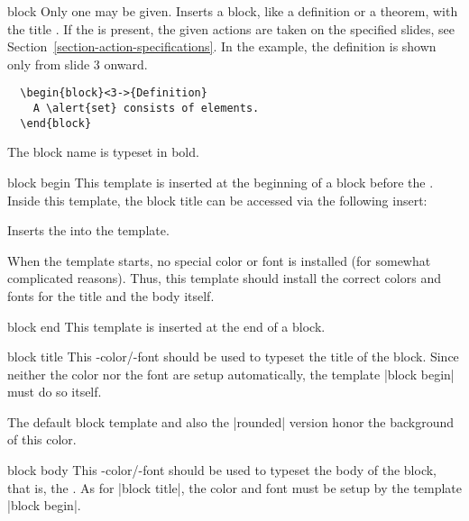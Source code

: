 \begin{environment}{{block}}
  Only one  may be given. Inserts a block, like a definition or a theorem, with the title . If the  is present, the given actions are taken on the specified slides, see Section~\ref{section-action-specifications}. In the example, the definition is shown only from slide 3 onward.
  \example
\begin{verbatim}
  \begin{block}<3->{Definition}
    A \alert{set} consists of elements.
  \end{block}
\end{verbatim}

  \articlenote
  The block name is typeset in bold.

  \begin{element}{block begin}\yes\no\no
    This template is inserted at the beginning of a block before the . Inside this template, the block title can be accessed via the following insert:
    \begin{itemize}
      \iteminsert{\insertblocktitle}
      Inserts the  into the template.
    \end{itemize}

    When the template starts, no special color or font is installed (for somewhat complicated reasons). Thus, this template should install the correct colors and fonts for the title and the body itself.
  \end{element}

  \begin{element}{block end}\yes\no\no
    This template is inserted at the end of a block.
  \end{element}

  \begin{element}{block title}\no\yes\yes
    This \beamer-color/-font should be used to typeset the title of the block. Since neither the color nor the font are setup automatically, the template |block begin| must do so itself.

    The default block template and also the |rounded| version honor the background of this color.
  \end{element}

  \begin{element}{block body}\no\yes\yes
    This \beamer-color/-font should be used to typeset the body of the block, that is, the . As for |block title|, the color and font must be setup by the template |block begin|.
  \end{element}
\end{environment}

